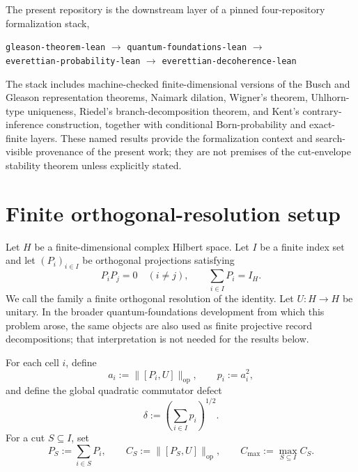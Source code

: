 \documentclass[11pt]{article}
\newcommand{\op}{\mathrm{op}}
\newcommand{\cmax}{C_{\max}}
\newcommand{\dd}{\delta}
\begin{document}
The present repository is the downstream layer of a pinned four-repository
formalization stack,
\begin{center}
\small
\texttt{gleason-theorem-lean}
$\to$
\texttt{quantum-foundations-lean}
$\to$\\
\texttt{everettian-probability-lean}
$\to$
\texttt{everettian-decoherence-lean}
\end{center}
The stack includes machine-checked finite-dimensional versions of the Busch
and Gleason representation theorems, Naimark dilation, Wigner's theorem,
Uhlhorn-type uniqueness, Riedel's branch-decomposition theorem, and Kent's
contrary-inference construction, together with conditional Born-probability
and exact-finite layers.  These named results provide the formalization
context and search-visible provenance of the present work; they are not
premises of the cut-envelope stability theorem unless explicitly stated.


\section{Finite orthogonal-resolution setup}

Let $H$ be a finite-dimensional complex Hilbert space.  Let
$I$ be a finite index set and let $(P_i)_{i\in I}$ be orthogonal projections
satisfying
\begin{equation}\label{eq:decomp}
  P_iP_j=0\quad(i\neq j),
  \qquad
  \sum_{i\in I}P_i=I_H.
\end{equation}
We call the family a finite orthogonal resolution of the identity.  Let
$U:H\to H$ be unitary.  In the broader quantum-foundations development from
which this problem arose, the same objects are also used as finite projective
record decompositions; that interpretation is not needed for the results
below.

For each cell $i$, define
\begin{equation}\label{eq:ai}
  a_i:=\|[P_i,U]\|_{\op},
  \qquad
  p_i:=a_i^2,
\end{equation}
and define the global quadratic commutator defect
\begin{equation}\label{eq:delta}
  \dd:=\left(\sum_{i\in I}p_i\right)^{1/2}.
\end{equation}
For a cut $S\subseteq I$, set
\begin{equation}\label{eq:cut}
  P_S:=\sum_{i\in S}P_i,
  \qquad
  C_S:=\|[P_S,U]\|_{\op},
  \qquad
  \cmax:=\max_{S\subseteq I}C_S.
\end{equation}
\end{document}
